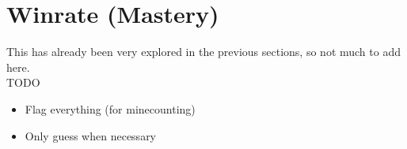 \section{Winrate (Mastery)}

This has already been very explored in the previous sections, so not much to add here.\\

TODO

\begin{itemize}
    \item Flag everything (for minecounting)
    \item Only guess when necessary
\end{itemize}